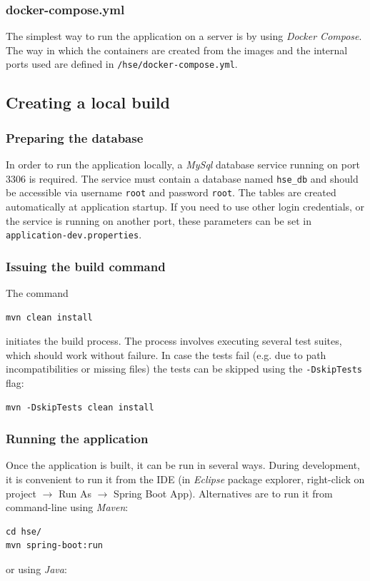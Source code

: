 \documentclass[fleqn]{article}
\begin{document}
\subsubsection{docker-compose.yml}

The simplest way to run the application on a server is by using \emph{Docker Compose}. The way in which the containers are created from the images
and the internal ports used are defined in 
\texttt{/hse/docker-compose.yml}.

\subsection{Creating a local build}

\subsubsection{Preparing the database}

In order to run the application locally, a \emph{MySql} database service running on port 3306 is required. The service must contain a database
named \texttt{hse\_db} and should be accessible via username \texttt{root} and password \texttt{root}. The tables
are created automatically at application startup. If you need to use other login credentials, or the service is running on another port, these
parameters can be set in \texttt{application-dev.properties}.

\subsubsection{Issuing the build command}

The command
\begin{verbatim}
mvn clean install
\end{verbatim}
initiates the build process. The process involves executing several test suites, which should work without failure. In case
the tests fail (e.g. due to path incompatibilities or missing files) the tests can be skipped using the \texttt{-DskipTests} flag:
\begin{verbatim}
mvn -DskipTests clean install
\end{verbatim}

\subsubsection{Running the application}

Once the application is built, it can be run in several ways. During development, it is convenient to run it from the IDE (in
\emph{Eclipse} package explorer, right-click on project $\rightarrow$ Run As $\rightarrow$ Spring Boot App). Alternatives are to run it from command-line using \emph{Maven}:
\begin{verbatim}
cd hse/
mvn spring-boot:run
\end{verbatim}
or using \emph{Java}:
\end{document}
